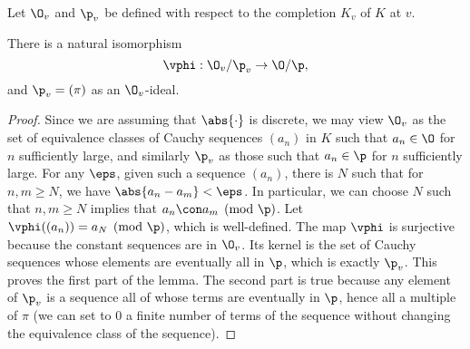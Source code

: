 \documentclass[11pt]{book}
\begin{document}
\begin{ch}
Let $\O_v$ and $\p_v$ be defined with respect to the completion $K_v$
of $K$ at $v$.
\begin{lemma}
There is a natural isomorphism
$$
\vphi:\O_v/\p_v \to \O/\p,
$$
and $\p_v = (\pi)$ as an $\O_v$-ideal.
\end{lemma}
\begin{proof}
  Since we are assuming that $\abs{\cdot}$ is discrete, we may view $\O_v$ as the set of equivalence classes of Cauchy
  sequences $(a_n)$ in $K$ such that $a_n\in \O$ for $n$ sufficiently
  large, and similarly $\p_v$ as those such that $a_n \in \p$ for $n$ sufficiently large.  For any $\eps$, given such a sequence $(a_n)$, there is $N$
  such that for $n,m\geq N$, we have $\abs{a_n-a_m}<\eps$.  In
  particular, we can choose $N$ such that $n,m\geq N$ implies that
  $a_n\con a_m\pmod{\p}$.  Let $\vphi((a_n)) = a_N\pmod{\p}$, which is
  well-defined.  The map $\vphi$ is surjective because the constant
  sequences are in $\O_v$.  Its kernel is the set of Cauchy sequences
  whose elements are eventually all in $\p$, which is exactly $\p_v$.
  This proves the first part of the lemma.  The second part is true
  because any element of $\p_v$ is a sequence all of whose terms are
  eventually in $\p$, hence all a multiple of $\pi$ (we can set to $0$
  a finite number of terms of the sequence without changing the
  equivalence class of the sequence).
\end{proof}


\end{ch}
\end{document}
